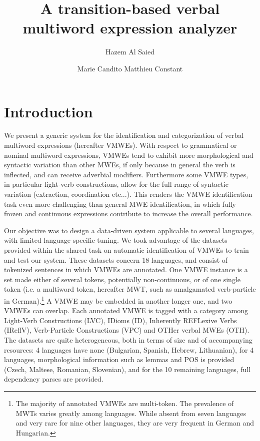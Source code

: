\documentclass[output=paper,modfonts]{langscibook}
\title{A transition-based verbal multiword expression analyzer}
\author{Hazem Al Saied\affiliation{ATILF UMR 7118, Universit\'e de Lorraine/CNRS}\and 
 Marie Candito\affiliation{LLF UMR 7110 Universit\'e Paris Diderot/CNRS}\lastand 
 Matthieu Constant\affiliation{ATILF UMR 7118, Universit\'e de Lorraine/CNRS}}
\begin{document}
\maketitle
\label{ALSAIED-CHAPTER}
\section{Introduction}
We present a generic system for the identification and categorization of verbal multiword expressions (hereafter VMWEs).
With respect to grammatical or nominal multiword expressions, VMWEs tend to exhibit more morphological and syntactic variation than other MWEs, if only because in general the verb is inflected, and can receive adverbial modifiers. Furthermore some VMWE types, in particular light-verb constructions, allow for the full range of syntactic variation (extraction, coordination etc...). This renders the VMWE identification task even more challenging than general MWE identification, in which fully frozen and continuous expressions contribute to increase the overall performance.

Our objective was to design a data-driven system applicable to several languages, with limited language-specific tuning. We took advantage of the datasets provided within the shared task on automatic identification of VMWEs \citep{MWEWorkshop} to train and test our system.
These datasets concern 18 languages, and consist of tokenized sentences in which VMWEs are annotated. One VMWE instance is a set made either of several tokens, potentially non-continuous, or of one single token  (i.e. a multiword token, hereafter MWT, such as amalgamated verb-particle in German).\footnote{The majority of annotated VMWEs are multi-token. The prevalence of MWTs varies greatly among languages. While absent from seven languages and very rare for nine other languages, they are very frequent in German and Hungarian.} A VMWE may be embedded in another longer one, and two VMWEs can overlap. Each annotated VMWE is tagged with a category among Light-Verb Constructions (LVC), IDioms (ID), Inherently REFLexive Verbs (IReflV), Verb-Particle Constructions (VPC) and OTHer verbal MWEs (OTH). The datasets are quite heterogeneous, both in terms of size and of accompanying resources: 4 languages have none (Bulgarian, Spanish, Hebrew, Lithuanian), for 4 languages, morphological information such as lemmas and POS is provided (Czech, Maltese, Romanian, Slovenian), and for the 10 remaining languages, full dependency parses are provided.
\end{document}
